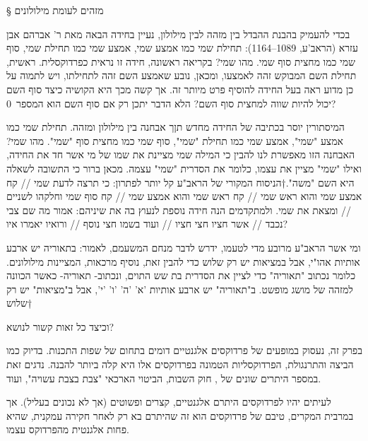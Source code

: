 \def\Title{שעשועים רקורסיביים}

§ מזהים לעומת מילולונים

בכדי להעמיק בהבנת ההבדל בין מזהה לבין מילולון, נעיין בחידה הבאה מאת ר' אברהם
אבן עזרא (הראב'ע, 1089–1164): תחילת שמי כמו אמצע שמי, אמצע שמי כמו תחילת שמי,
סוף שמי כמו מחצית סוף שמי. מהו שמי? בקריאה ראשונה, חידה זו נראית כפרדוקסלית.
ראשית, תחילת השם המבוקש זהה לאמצעו, ומכאן, נובע שאמצע השם זהה לתחילתו, ויש
לתמוה על כן מדוע ראה בעל החידה להוסיף פרט מיותר זה. אך קשה מכך היא הקושיה כיצד
סוף השם יכול להיות שווה למחצית סוף השם? הלא הדבר יתכן רק אם סוף השם הוא
המספר~0?

      המיסתורין יוסר בכתיבה של החידה מחדש תןך אבחנה בין מילולון ומזהה. תחילת
      שמי כמו אמצע "שמי", אמצע שמי כמו תחילת "שמי", סוף שמי כמו מחצית סוף
      "שמי". מהו שמי? האבחנה הזו מאפשרת לנו להבין כי המילה שמי מציינת את שמו
      של מי אשר חד את החידה, ואילו "שמי" מציין את עצמו, כלומר את הסדרית "שמי"
      עצמה. מכאן ברור כי התשובה לשאלה היא השם "משה".†{הניסוח המקורי של הראב"ע
      קל יותר לפתרון: כי תרצה לדעת שמי // קח אמצע שמי והוא ראש שמי // קח ראש
    שמי והוא אמצע שמי // קח סוף שמי וחלקהו לשניים // ומצאת את שמי. ולמתקדמים
  הנה חידה נוספת לנעוץ בה את שיניהם: אמור מה שם צבי נכבד // אשר חציו חצי חציו
// ועוד בשמו חצי נוסף // ורואיו יאמרו איו?}

      ומי אשר הראב"ע מרובע מדי לטעמו, ידרש לדבר מנחם המשעמם, לאמור: בתאוריה יש
      ארבע אותיות אהו"י, אבל במציאות יש רק שלוש כדי להבין זאת, נוסיף מרכאות,
      המציינות מילולונים. כלומר נכתוב "תאוריה" כדי לציין את הסדרית בת שש התוים,
      ונכתוב- תאוריה- כאשר הכוונה למזהה של מושג מופשט. ב"תאוריה" יש ארבע
      אותיות 'א' 'ה' 'ו' 'י', אבל ב"מציאות" יש רק שלוש†{}

וכיצד כל זאות קשור לנושא?

בפרק זה, נעסוק במופעים של פרדוקסים אלגנטיים דומים בתחום של שפות התכנות. בדיוק
    כמו הביצה והתרנגולת, הפרדוקסליות הטמונה בפרדוקסים אלו היא קלה ביותר להבנה.
נדגים זאת במספר היתרים שונים של , חוק השבות, הביטוי
    הארכאי "צבת בצבת עשויה", ועוד.

לעיתים יהיו לפרדוקסים היתרם אלגנטיים, קצרים ופשוטים (אך לא נכונים בעליל). אך
    במרבית המקרים, טיבם של פרדוקסים הוא זה שהיתרם בא רק לאחר חקירה עמקנית, שהיא
    פחות אלגנטית מהפרדוקס עצמו.

